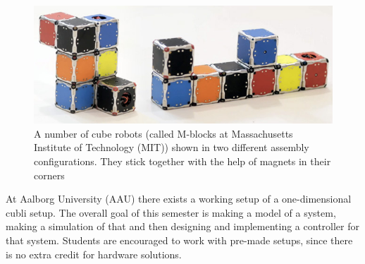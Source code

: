 \begin{figure}[H] 
	\centering 
	\includegraphics[scale=0.4]{figures/m-blocks}
	\caption{A number of cube robots (called M-blocks at Massachusetts Institute of Technology (MIT)) shown in two different assembly configurations. They stick together with the help of magnets in their corners\cite{LRosen}}
	\label{MBlocksExample}
\end{figure} 
At Aalborg University (AAU) there exists a working setup of a one-dimensional cubli setup. The overall goal of this semester is making a model of a system, making a simulation of that and then designing and implementing a controller for that system. Students are encouraged to work with pre-made setups, since there is no extra credit for hardware solutions.





